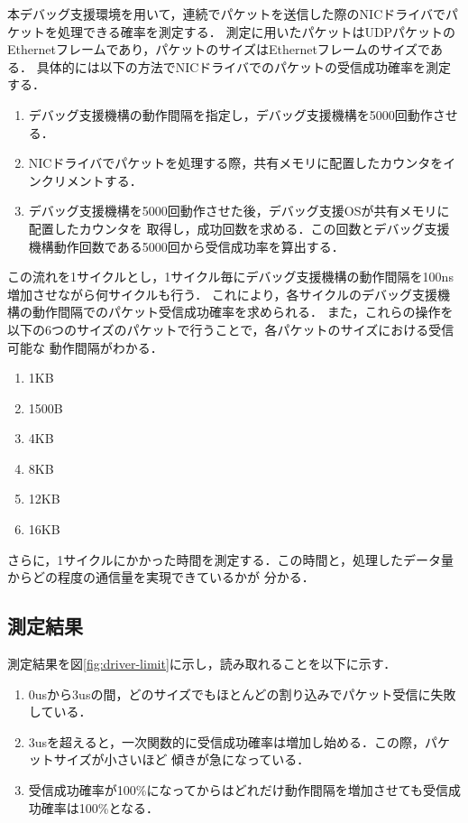 \documentclass[12pt]{jsarticle}
\begin{document}
本デバッグ支援環境を用いて，連続でパケットを送信した際のNICドライバでパケットを処理できる確率を測定する．
測定に用いたパケットはUDPパケットのEthernetフレームであり，パケットのサイズはEthernetフレームのサイズである．
具体的には以下の方法でNICドライバでのパケットの受信成功確率を測定する．
\begin{enumerate}
    \item デバッグ支援機構の動作間隔を指定し，デバッグ支援機構を5000回動作させる．
    \item NICドライバでパケットを処理する際，共有メモリに配置したカウンタをインクリメントする．
    \item デバッグ支援機構を5000回動作させた後，デバッグ支援OSが共有メモリに配置したカウンタを
        取得し，成功回数を求める．この回数とデバッグ支援機構動作回数である5000回から受信成功率を算出する．
\end{enumerate}
この流れを1サイクルとし，1サイクル毎にデバッグ支援機構の動作間隔を100ns増加させながら何サイクルも行う．
これにより，各サイクルのデバッグ支援機構の動作間隔でのパケット受信成功確率を求められる．
また，これらの操作を以下の6つのサイズのパケットで行うことで，各パケットのサイズにおける受信可能な
動作間隔がわかる．
\begin{enumerate}
    \item 1KB
    \item 1500B
    \item 4KB
    \item 8KB
    \item 12KB
    \item 16KB
\end{enumerate}
さらに，1サイクルにかかった時間を測定する．この時間と，処理したデータ量からどの程度の通信量を実現できているかが
分かる．

\subsection{測定結果}\label{result-driver-limit}

測定結果を図\ref{fig:driver-limit}に示し，読み取れることを以下に示す．

\begin{enumerate}
    \item 0usから3usの間，どのサイズでもほとんどの割り込みでパケット受信に失敗している．
    \item 3usを超えると，一次関数的に受信成功確率は増加し始める．この際，パケットサイズが小さいほど
        傾きが急になっている．
    \item 受信成功確率が100\%になってからはどれだけ動作間隔を増加させても受信成功確率は100\%となる．
\end{enumerate}
\end{document}
